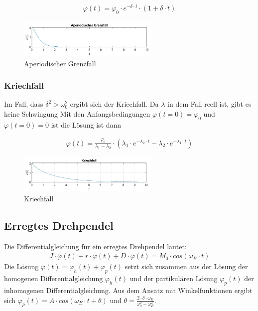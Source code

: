 \documentclass{article}
\begin{document}
\begin{gather} \label{eq:schwingung_partikulaere_loesung}
    \varphi(t) = \varphi_0 \cdot e^{-\delta \cdot t} \cdot (1 + \delta \cdot t)
\end{gather}

\begin{figure}[H]
    \centering
    \includegraphics[width=0.6\textwidth]{bilder/aperiodischer_grenzfall.png}
    \caption{Aperiodischer Grenzfall}
    \label{fig:aperiod}
\end{figure}

\subsubsection{Kriechfall}
Im Fall, dass $\delta^2 > \omega_0^2$ ergibt sich der Kriechfall. Da $\lambda$ in dem Fall reell ist, gibt es keine Schwingung
Mit den Anfangsbedingungen $\varphi(t = 0) = \varphi_0$ und $\dot \varphi(t = 0) = 0$ ist die Lösung ist dann


\begin{gather} \label{eq:schwingung_partikulaere_loesung}
    \varphi(t) = \frac{\varphi_0}{\lambda_1 - \lambda_2} \cdot (\lambda_1 \cdot e^{- \lambda_2 \cdot t} - \lambda_2 \cdot e^{- \lambda_1 \cdot t})
\end{gather}

\begin{figure}[H]
    \centering
    \includegraphics[width=0.6\textwidth]{bilder/kriechfall.png}
    \caption{Kriechfall}
    \label{fig:kriech}
\end{figure}

\subsection{Erregtes Drehpendel}
Die Differentialgleichung für ein erregtes Drehpendel lautet:
\begin{gather} \label{eq:schwingung_partikulaere_loesung}
    J \cdot \ddot \varphi(t) + r \cdot \dot \varphi(t) + D \cdot \varphi(t) = M_0 \cdot cos(\omega_E \cdot t)
\end{gather}
Die Lösung $\varphi(t) = \varphi_h(t) + \varphi_p(t)$ setzt sich zusammen aus der Lösung der homogenen Differentialgleichung $\varphi_h(t)$ und der partikulären Lösung $\varphi_p(t)$ der inhomogenen
Differentialgleichung. Aus dem Ansatz mit Winkelfunktionen ergibt sich
$\varphi_p(t) = A \cdot cos(\omega_E \cdot t + \theta)$ und $\theta = \frac{2 \cdot \delta \cdot \omega_E}{\omega_0^2 - \omega_E^2}$.
\end{document}
